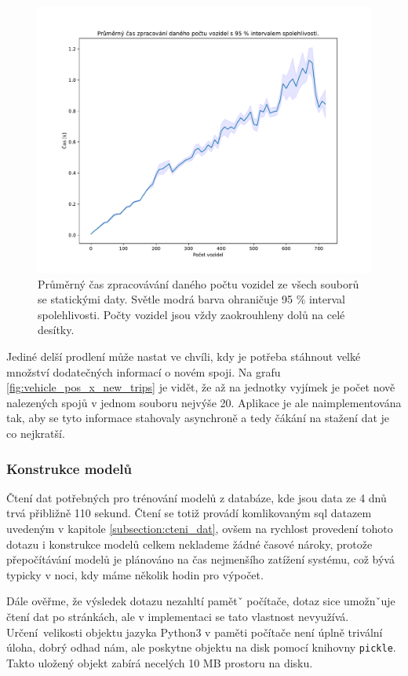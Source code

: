 \bigbreak

\begin{figure}
	\centering
  \includegraphics[width=0.7\linewidth]{../img/file_process_time}
  \caption{Průměrný čas zpracovávání daného počtu vozidel ze všech souborů se statickými daty. Světle modrá barva ohraničuje 95 \% interval spolehlivosti. Počty vozidel jsou vždy zaokrouhleny dolů na celé desítky.}
  \label{fig:file_process_time}
\end{figure}

\bigbreak

Jediné delší prodlení může nastat ve chvíli, kdy je potřeba stáhnout velké množství dodatečných informací o novém spoji. Na grafu \ref{fig:vehicle_pos_x_new_trips} je vidět, že až na jednotky vyjímek je počet nově nalezených spojů v jednom souboru nejvýše 20. Aplikace je ale naimplementována tak, aby se tyto informace stahovaly asynchroně a tedy čákání na stažení dat je co nejkratší.

\subsubsection{Konstrukce modelů}

Čtení dat potřebných pro trénování modelů z databáze, kde jsou data ze 4 dnů trvá přibližně 110 sekund. Čtení se totiž provádí komlikovaným \gls{sql} datazem uvedeným v kapitole \ref{subsection:cteni_dat}, ovšem na rychlost provedení tohoto dotazu i konstrukce modelů celkem neklademe žádné časové nároky, protože přepočítávání modelů je plánováno na čas nejmenšího zatížení systému, což bývá typicky v noci, kdy máme několik hodin pro výpočet.

\bigbreak

Dále ověřme, že výsledek dotazu nezahltí pamětˇ počítače, dotaz sice umožnˇuje čtení dat po stránkách, ale v implementaci se tato vlastnost nevyužívá. Určení velikosti objektu jazyka Python3 v paměti počítače není úplně trivální úloha, dobrý odhad nám, ale poskytne objektu na disk pomocí knihovny \verb-pickle-. Takto uložený objekt zabírá necelých 10 MB prostoru na disku.

